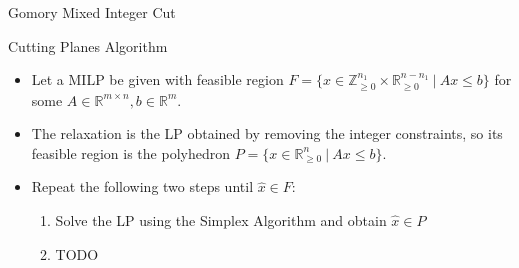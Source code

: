 \begin{frame}{Gomory Mixed Integer Cut}



\end{frame}

\begin{frame}{Cutting Planes Algorithm}
\begin{itemize}
\item Let a MILP be given with feasible region $F = \{x \in \mathbb{Z}_{\geq 0}^{n_1} \times \mathbb{R}_{\geq 0}^{n-n_1} \:\vert\: Ax \leq b \}$ for some $A \in \mathbb{R}^{m \times n}, b \in \mathbb{R}^m$.
\item The relaxation is the LP obtained by removing the integer constraints, so its feasible region is the polyhedron $P = \{x \in \mathbb{R}_{\geq 0}^{n} \:\vert\: Ax \leq b \}$.
\item Repeat the following two steps until $\hat{x} \in F$:
\begin{enumerate}
\item Solve the LP using the Simplex Algorithm and obtain $\hat{x} \in P$
\item TODO %
\end{enumerate}
\end{itemize}
\end{frame}

